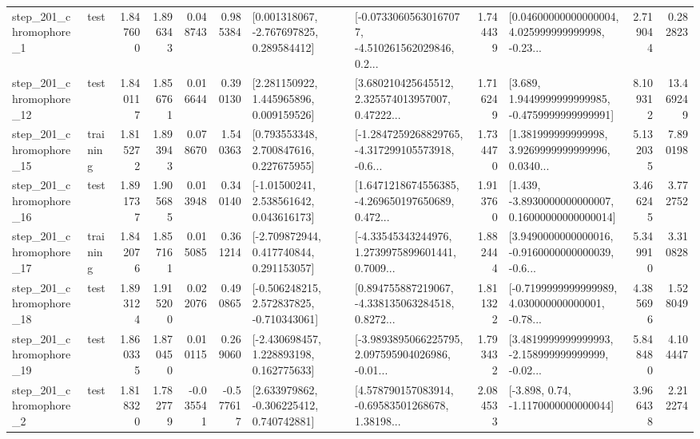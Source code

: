 \begin{tabular}{llrrrrllrlrr}
   step\_201\_chromophore\_1 &      test &      1.847600 &    1.896343 &      0.048743 &  0.985384 &    [0.001318067, -2.767697825, 0.289584412] &  [-0.07330605630167077, -4.510261562029846, 0.2... &       1.744439 &  [0.04600000000000004, 4.025999999999998, -0.23... &            2.719044 &          0.282823 \\
  step\_201\_chromophore\_12 &      test &      1.840117 &    1.856761 &      0.016644 &  0.390130 &     [2.281150922, 1.445965896, 0.009159526] &  [3.680210425645512, 2.325574013957007, 0.47222... &       1.716249 &   [3.689, 1.9449999999999985, -0.4759999999999991] &            8.109312 &         13.469249 \\
  step\_201\_chromophore\_15 &  training &      1.815272 &    1.893943 &      0.078670 &  1.540363 &     [0.793553348, 2.700847616, 0.227675955] &  [-1.2847259268829765, -4.317299105573918, -0.6... &       1.734470 &  [1.381999999999998, 3.9269999999999996, 0.0340... &            5.132035 &          7.890198 \\
  step\_201\_chromophore\_16 &      test &      1.891737 &    1.905685 &      0.013948 &  0.340140 &     [-1.01500241, 2.538561642, 0.043616173] &  [1.6471218674556385, -4.269650197650689, 0.472... &       1.913760 &  [1.439, -3.8930000000000007, 0.16000000000000014] &            3.466245 &          3.772752 \\
  step\_201\_chromophore\_17 &  training &      1.842076 &    1.857161 &      0.015085 &  0.361214 &    [-2.709872944, 0.417740844, 0.291153057] &  [-4.33545343244976, 1.2739975899601441, 0.7009... &       1.882444 &  [3.9490000000000016, -0.9160000000000039, -0.6... &            5.349910 &          3.310828 \\
  step\_201\_chromophore\_18 &      test &      1.893124 &    1.915200 &      0.022076 &  0.490865 &   [-0.506248215, 2.572837825, -0.710343061] &  [0.894755887219067, -4.338135063284518, 0.8272... &       1.811322 &  [-0.7199999999999989, 4.030000000000001, -0.78... &            4.385696 &          1.528049 \\
  step\_201\_chromophore\_19 &      test &      1.860335 &    1.870450 &      0.010115 &  0.269060 &    [-2.430698457, 1.228893198, 0.162775633] &  [-3.9893895066225795, 2.097595904026986, -0.01... &       1.793432 &  [3.4819999999999993, -2.158999999999999, -0.02... &            5.848480 &          4.104447 \\
   step\_201\_chromophore\_2 &      test &      1.818320 &    1.782779 &     -0.035541 & -0.577617 &    [2.633979862, -0.306225412, 0.740742881] &  [4.578790157083914, -0.69583501268678, 1.38198... &       2.084533 &                [-3.898, 0.74, -1.1170000000000044] &            3.966438 &          2.212274 \\

\end{tabular}

